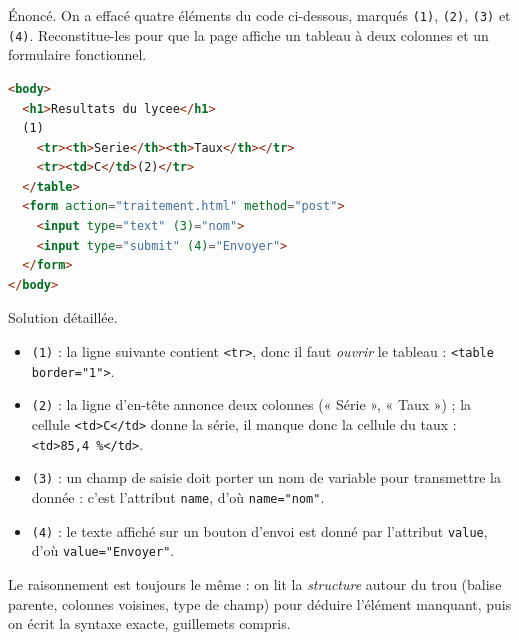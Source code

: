 \documentclass[11pt]{article}
\begin{document}
\begin{exoresolu}
Énoncé. On a effacé quatre éléments du code ci-dessous, marqués \texttt{(1)}, \texttt{(2)}, \texttt{(3)} et \texttt{(4)}. Reconstitue-les pour que la page affiche un tableau à deux colonnes et un formulaire fonctionnel.
\begin{lstlisting}[language=HTML]
<body>
  <h1>Resultats du lycee</h1>
  (1)
    <tr><th>Serie</th><th>Taux</th></tr>
    <tr><td>C</td>(2)</tr>
  </table>
  <form action="traitement.html" method="post">
    <input type="text" (3)="nom">
    <input type="submit" (4)="Envoyer">
  </form>
</body>
\end{lstlisting}
\tcblower
Solution détaillée.
\begin{itemize}
\item \texttt{(1)} : la ligne suivante contient \texttt{<tr>}, donc il faut \emph{ouvrir} le tableau : \texttt{<table border="1">}.
\item \texttt{(2)} : la ligne d'en-tête annonce deux colonnes (« Série », « Taux ») ; la cellule \texttt{<td>C</td>} donne la série, il manque donc la cellule du taux : \texttt{<td>85,4 \%</td>}.
\item \texttt{(3)} : un champ de saisie doit porter un nom de variable pour transmettre la donnée : c'est l'attribut \texttt{name}, d'où \texttt{name="nom"}.
\item \texttt{(4)} : le texte affiché sur un bouton d'envoi est donné par l'attribut \texttt{value}, d'où \texttt{value="Envoyer"}.
\end{itemize}
Le raisonnement est toujours le même : on lit la \emph{structure} autour du trou (balise parente, colonnes voisines, type de champ) pour déduire l'élément manquant, puis on écrit la syntaxe exacte, guillemets compris.
\end{exoresolu}
\end{document}

